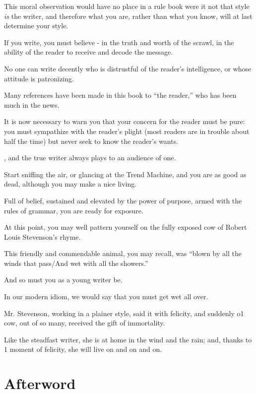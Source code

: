 \documentclass{book}
\numberwithin{equation}{section}
\begin{document}
This moral observation would have no place in a rule book were it not that style \textit{is} the writer, and therefore what you are, rather than what you know, will at last determine your style.

If you write, you must believe - in the truth and worth of the scrawl, in the ability of the reader to receive and decode the message.

No one can write decently who is distrustful of the reader's intelligence, or whose attitude is patronizing.

%
Many references have been made in this book to ``the reader,'' who has been much in the news.

It is now necessary to warn you that your concern for the reader must be pure: you must sympathize with the reader's plight (most readers are in trouble about half the time) but never seek to know the reader's wants.

, and the true writer always plays to an audience of one.

Start sniffing the air, or glancing at the Trend Machine, and you are as good as dead, although you may make a nice living.

%
Full of belief, sustained and elevated by the power of purpose, armed with the rules of grammar, you are ready for exposure.

At this point, you may well pattern yourself on the fully exposed cow of Robert Louis Stevenson's rhyme.

This friendly and commendable animal, you may recall, was ``blown by all the winds that pass/And wet with all the showers.''

And so must you as a young writer be.

In our modern idiom, we would say that you must get wet all over.

Mr. Stevenson, working in a plainer style, said it with felicity, and suddenly o1 cow, out of so many, received the gift of immortality.

Like the steadfast writer, she is at home in the wind and the rain; and, thanks to 1 moment of felicity, she will live on and on and on.


\chapter{Afterword}
\end{document}
